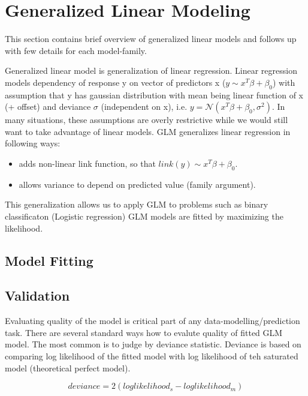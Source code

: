 \documentclass[11pt]{article}
\begin{document}
\section{Generalized Linear Modeling} 
This section contains brief overview of generalized linear models and follows up with few details for each model-family.

Generalized linear model is generalization of linear regression. Linear regression models dependency of response y on vector of predictors x ($y \sim x^T \beta + \beta_0$) with assumption that y has gaussian distribution with mean being linear function of x (+ offset) and deviance $\sigma$ (independent on x), i.e. $ y = \mathcal{N}(x^T \beta + \beta_0 , \sigma^2) $. In many situations, these assumptions are overly restrictive while we would still want to take advantage of linear models. GLM generalizes linear regression in following ways: 
\begin{itemize} 
\item adds non-linear link function, so that $link(y) \sim x^T \beta + \beta_0$.
\item allows variance to depend on predicted value (family argument).
\end{itemize}
This generalization allows us to apply GLM to problems such as binary classificaton (Logistic regression) 
GLM models are fitted by maximizing the likelihood.

\subsection{Model Fitting}
\subsection{Validation}
Evaluating quality of the model is critical part of any data-modelling/prediction task. There are several standard ways how to evalute quality of fitted GLM model. The most common is to judge by deviance statistic. Deviance is based on comparing log likelihood of the fitted model with log likelihood of teh saturated model (theoretical perfect model).

\[ deviance = 2({loglikelihood_{s}} - {loglikelihood_{m}}) \]
\end{document}
